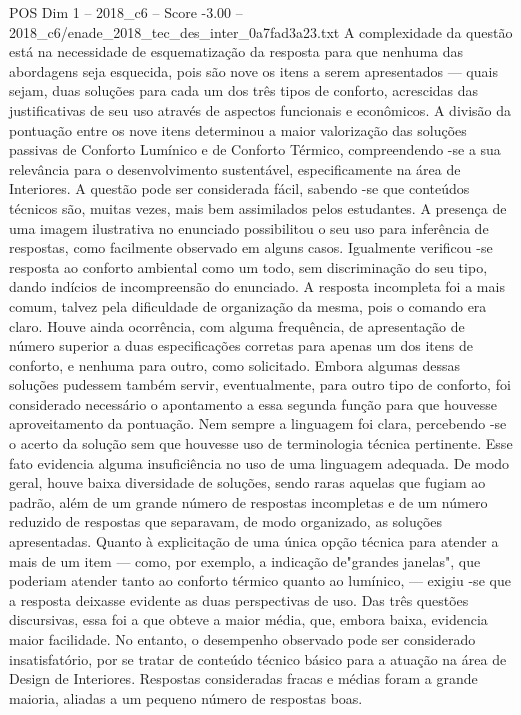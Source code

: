 \begin{textsample}{POS Dim 1 – 2018\_c6 – Score -3.00 – 2018\_c6/enade\_2018\_tec\_des\_inter\_0a7fad3a23.txt}
A complexidade da questão está na necessidade de esquematização da resposta para que nenhuma das abordagens seja esquecida, pois são nove os itens a serem apresentados — quais sejam, duas soluções para cada um dos três tipos de conforto, acrescidas das justificativas de seu uso através de aspectos funcionais e econômicos.
A divisão da pontuação entre os nove itens determinou a maior valorização das soluções passivas de Conforto Lumínico e de Conforto Térmico, compreendendo -se a sua relevância para o desenvolvimento sustentável, especificamente na área de Interiores.
A questão pode ser considerada fácil, sabendo -se que conteúdos técnicos são, muitas vezes, mais bem assimilados pelos estudantes.
A presença de uma imagem ilustrativa no enunciado possibilitou o seu uso para inferência de respostas, como facilmente observado em alguns casos.
Igualmente verificou -se resposta ao conforto ambiental como um todo, sem discriminação do seu tipo, dando indícios de incompreensão do enunciado.
A resposta incompleta foi a mais comum, talvez pela dificuldade de organização da mesma, pois o comando era claro.
Houve ainda ocorrência, com alguma frequência, de apresentação de número superior a duas especificações corretas para apenas um dos itens de conforto, e nenhuma para outro, como solicitado.
Embora algumas dessas soluções pudessem também servir, eventualmente, para outro tipo de conforto, foi considerado necessário o apontamento a essa segunda função para que houvesse aproveitamento da pontuação.
Nem sempre a linguagem foi clara, percebendo -se o acerto da solução sem que houvesse uso de terminologia técnica pertinente.
Esse fato evidencia alguma insuficiência no uso de uma linguagem adequada.
De modo geral, houve baixa diversidade de soluções, sendo raras aquelas que fugiam ao padrão, além de um grande número de respostas incompletas e de um número reduzido de respostas que separavam, de modo organizado, as soluções apresentadas.
Quanto à explicitação de uma única opção técnica para atender a mais de um item — como, por exemplo, a indicação de"grandes janelas", que poderiam atender tanto ao conforto térmico quanto ao lumínico, — exigiu -se que a resposta deixasse evidente as duas perspectivas de uso.
Das três questões discursivas, essa foi a que obteve a maior média, que, embora baixa, evidencia maior facilidade.
No entanto, o desempenho observado pode ser considerado insatisfatório, por se tratar de conteúdo técnico básico para a atuação na área de Design de Interiores.
Respostas consideradas fracas e médias foram a grande maioria, aliadas a um pequeno número de respostas boas.

\end{textsample}
